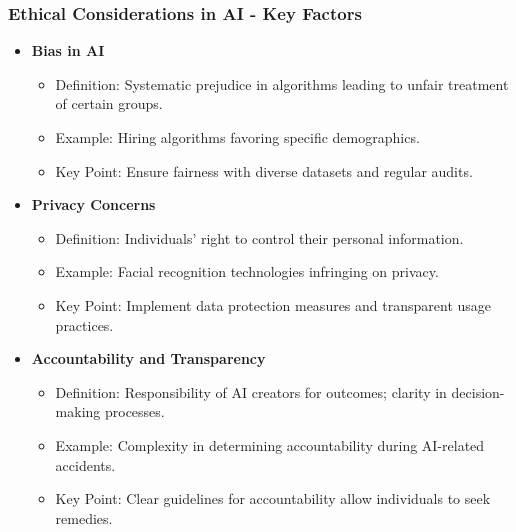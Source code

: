 \documentclass[aspectratio=169]{beamer}
\begin{document}
\begin{frame}[fragile]
    \frametitle{Ethical Considerations in AI - Key Factors}
    \begin{itemize}
        \item \textbf{Bias in AI}
        \begin{itemize}
            \item Definition: Systematic prejudice in algorithms leading to unfair treatment of certain groups.
            \item Example: Hiring algorithms favoring specific demographics.
            \item Key Point: Ensure fairness with diverse datasets and regular audits.
        \end{itemize}
        
        \item \textbf{Privacy Concerns}
        \begin{itemize}
            \item Definition: Individuals' right to control their personal information.
            \item Example: Facial recognition technologies infringing on privacy.
            \item Key Point: Implement data protection measures and transparent usage practices.
        \end{itemize}
        
        \item \textbf{Accountability and Transparency}
        \begin{itemize}
            \item Definition: Responsibility of AI creators for outcomes; clarity in decision-making processes.
            \item Example: Complexity in determining accountability during AI-related accidents.
            \item Key Point: Clear guidelines for accountability allow individuals to seek remedies.
        \end{itemize}
    \end{itemize}
\end{frame}
\end{document}
